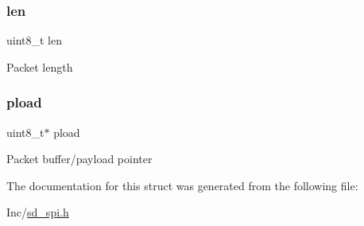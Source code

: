 \subsubsection{\texorpdfstring{len}{len}}
{\footnotesize\ttfamily uint8\+\_\+t len}

Packet length \mbox{\label{structsd__spi__packet_a9aacead5af8fd516f2301fe34ff50c29}} 
\subsubsection{\texorpdfstring{pload}{pload}}
{\footnotesize\ttfamily uint8\+\_\+t$\ast$ pload}

Packet buffer/payload pointer 

The documentation for this struct was generated from the following file\+:\begin{DoxyCompactItemize}
\item 
Inc/\mbox{\hyperlink{sd__spi_8h}{sd\+\_\+spi.\+h}}\end{DoxyCompactItemize}
